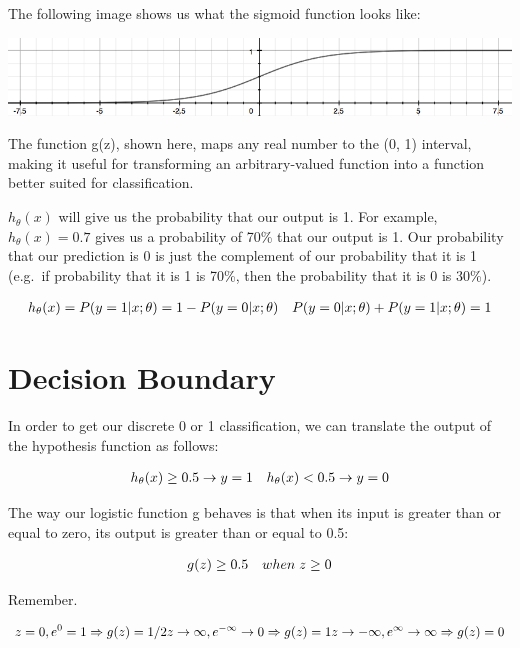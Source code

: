 \documentclass[
]{book}
\begin{document}
The following image shows us what the sigmoid function looks like:

\includegraphics{Sigmoid_function.png}

The function g(z), shown here, maps any real number to the (0, 1) interval, making it useful for transforming an arbitrary-valued function into a function better suited for classification.

\(h_\theta(x)\) will give us the probability that our output is 1. For example, \(h_\theta(x)=0.7\) gives us a probability of 70\% that our output is 1. Our probability that our prediction is 0 is just the complement of our probability that it is 1 (e.g.~if probability that it is 1 is 70\%, then the probability that it is 0 is 30\%).

\begin{align}& h_\theta(x) = P(y=1 | x ; \theta) = 1 - P(y=0 | x ; \theta) \newline& P(y = 0 | x;\theta) + P(y = 1 | x ; \theta) = 1\end{align}

\hypertarget{decision-boundary}{%
\section{Decision Boundary}\label{decision-boundary}}

In order to get our discrete 0 or 1 classification, we can translate the output of the hypothesis function as follows:

\begin{align}& h_\theta(x) \geq 0.5 \rightarrow y = 1 \newline& h_\theta(x) < 0.5 \rightarrow y = 0 \newline\end{align}

The way our logistic function g behaves is that when its input is greater than or equal to zero, its output is greater than or equal to 0.5:

\begin{align}& g(z) \geq 0.5 \newline& when \; z \geq 0\end{align}

Remember.

\begin{align}z=0, e^{0}=1 \Rightarrow g(z)=1/2\newline z \to \infty, e^{-\infty} \to 0 \Rightarrow g(z)=1 \newline z \to -\infty, e^{\infty}\to \infty \Rightarrow g(z)=0 \end{align}
\end{document}
